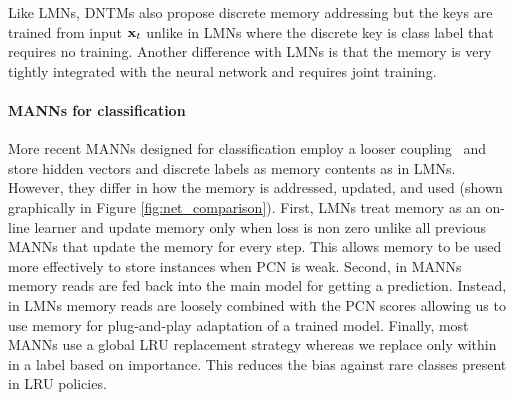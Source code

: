 \documentclass[letterpaper]{article} %
\newcommand{\vek}[1]{{\bf {#1}}}
\newcommand{\vx}{{\vek{x}}}
\def\sunita#1{\todo [color=purple]{Sunita: #1}}
\begin{document}
Like LMNs, DNTMs also propose discrete memory addressing but the keys are trained from input $\vx_t$ unlike in LMNs where the discrete key is class label that requires no training.
Another difference with LMNs is that the memory is very tightly integrated with the neural network and requires joint training. 



\paragraph{MANNs for classification}
More recent MANNs designed for classification employ a looser coupling~\cite{kaiser2017,SantoroBBWL16} and store hidden vectors and discrete labels as memory contents as in LMNs. 
%
However, they differ in how the memory is addressed, updated, and used (shown graphically in Figure \ref{fig:net_comparison}).
First, LMNs treat memory as an on-line learner and update memory only when loss is non zero unlike all previous MANNs that update the memory for every step.  This allows memory to be used more effectively to store instances when PCN is weak.
Second, in MANNs memory reads are fed back into the main model for getting a prediction.  Instead, in LMNs memory reads are loosely combined with the PCN scores allowing us to use memory for plug-and-play adaptation of a trained model.  Finally, most MANNs use a global LRU replacement strategy whereas we replace only within in a label based on importance. This reduces the bias against rare classes present in LRU policies.


\end{document}
